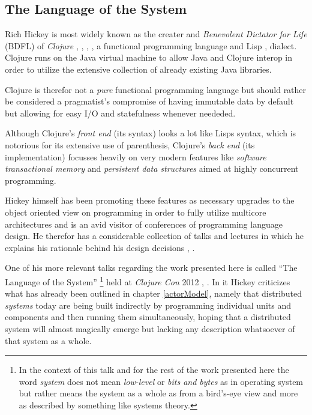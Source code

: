 \subsection{The Language of the System}
\label{LanguageOfTheSystem}

Rich Hickey is most widely known as the creater and
\textit{Benevolent Dictator for Life} (BDFL) \cite{bdfl} of
\textit{Clojure} \cite{clojure2008}, \cite{clojure2010},
\cite{clojure.org}, \cite{clojure-rationale},
a functional programming language and Lisp \cite{lisp86},
\cite{commonlisp90} dialect.
Clojure runs on the Java virtual machine to allow Java and Clojure interop
in order to utilize the extensive collection of already existing
Java libraries.

Clojure is therefor not a \textit{pure} \cite{pure}
functional programming language but should rather be considered a
pragmatist's compromise of having immutable data by default but
allowing for easy I/O and statefulness whenever neededed.

Although Clojure's \textit{front end} (its syntax) looks a lot like
Lisps syntax, which is notorious for its extensive use of
parenthesis, Clojure's \textit{back end} (its implementation)
focusses heavily on very modern features like
\textit{software transactional memory} \cite{stm} and
\textit{persistent data structures} \cite{persistentdatastructures}
aimed at highly concurrent programming.

Hickey himself has been promoting these features as necessary
upgrades to the object oriented view on programming in order to
fully utilize multicore architectures and is an avid
visitor of conferences of programming language design. He therefor has
a considerable collection of talks and lectures in which he explains
his rationale behind his design decisions \cite{hickey-talks},
\cite{hickey-bestof}.
\newline

One of his more relevant talks regarding the work presented here
is called ``The Language of the System''
\footnote{In the context of this talk and for the rest of the work presented
here the word \textit{system} does not mean \textit{low-level} or
\textit{bits and bytes} as in operating system but rather means
the system as a whole as from a bird's-eye view and more as
described by something like systems theory.}
held at \textit{Clojure Con} 2012 \cite{hickey-systemlang},
\cite{clojurecon}.
In it Hickey criticizes what has already been outlined in
chapter \ref{actorModel}, namely that distributed \textit{systems}
today are being built indirectly by programming individual units and
components and then running them simultaneously, hoping that a
distributed system will almost magically emerge but lacking any
description whatsoever of that system as a whole.

